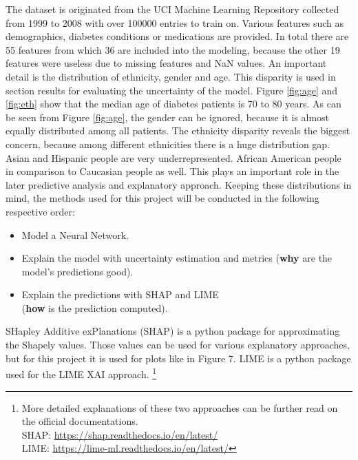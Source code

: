 \documentclass[journal]{IEEEtran}
\begin{document}
\noindent The dataset is originated from the UCI Machine Learning Repository \cite{uci} collected from 1999 to 2008 with over 100000 entries to train on. Various features such as demographics, diabetes conditions or medications are provided. In total there are 55 features from which 36 are included into the modeling, because the other 19 features were useless due to missing features and NaN values. An important detail is the distribution of ethnicity, gender and age. This disparity is used in section results for evaluating the uncertainty of the model. Figure \ref{fig:age} and \ref{fig:eth} show that the median age of diabetes patients is 70 to 80 years. As can be seen from Figure \ref{fig:age}, the gender can be ignored, because it is almost equally distributed among all patients. The ethnicity disparity reveals the biggest concern, because among different ethnicities there is a huge distribution gap. Asian and Hispanic people are very underrepresented. African American people in comparison to Caucasian people as well. This plays an important role in the later predictive analysis and explanatory approach. Keeping these distributions in mind, the methods used for this project will be conducted in the following respective order: \\

\begin{itemize}
	\item Model a Neural Network.
	\item Explain the model with uncertainty estimation and metrics (\textbf{why} are the model's predictions good).
	\item Explain the predictions with SHAP and LIME \\ (\textbf{how} is the prediction computed). \\
\end{itemize}

SHapley Additive exPlanations (SHAP) is a python package for approximating the Shapely values. Those values can be used for various explanatory approaches, but for this project it is used for plots like in Figure 7. LIME is a python package used for the LIME XAI approach. \footnote{More detailed explanations of these two approaches can be further read on the official documentations. \\ SHAP: \url{https://shap.readthedocs.io/en/latest/} \\ LIME: \url{https://lime-ml.readthedocs.io/en/latest/}}
	
\end{document}
